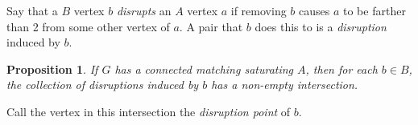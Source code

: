\documentclass[12 pt]{article}
\newtheorem{prop}{Proposition}
\begin{document}
Say that a $B$ vertex $b$ {\it disrupts} an $A$ vertex $a$ if removing $b$ causes $a$ to be farther than 2 from some other vertex of $a$. A pair that $b$ does this to is a {\it disruption} induced by $b$.
\begin{prop}
	If $G$ has a connected matching saturating $A$, then for each $b\in B$, the collection of disruptions induced by $b$ has a non-empty intersection.   
\end{prop}
Call the vertex in this intersection the {\it disruption point} of $b$.
\end{document}
